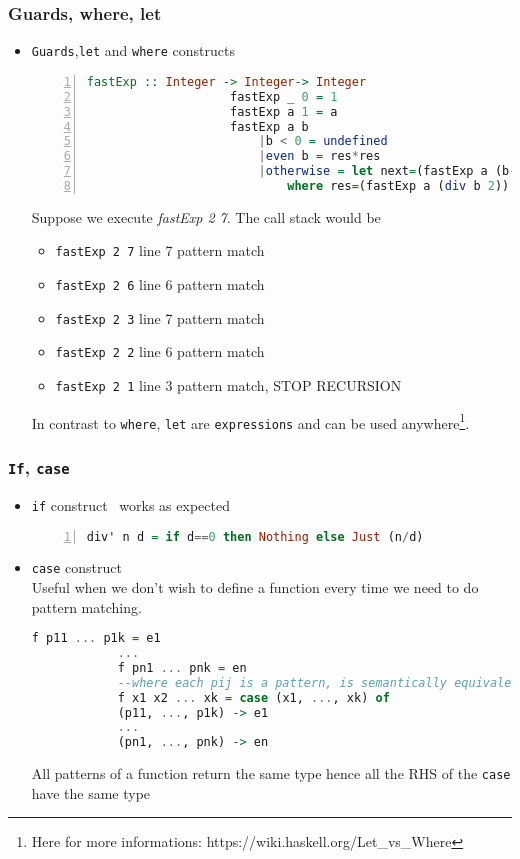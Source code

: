 	\begin{frame}[fragile]\frametitle{Guards, where, let}
		\begin{itemize}
			\item \texttt{Guards},\texttt{let} and \texttt{where} constructs
			\begin{lstlisting}[language=Haskell,basicstyle=\footnotesize\ttfamily,numbers=left]
			fastExp :: Integer -> Integer-> Integer
					fastExp _ 0 = 1
					fastExp a 1 = a
					fastExp a b 
					 	|b < 0 = undefined
					 	|even b = res*res
					 	|otherwise = let next=(fastExp a (b-1)) in (a * next)  
						  	where res=(fastExp a (div b 2))
			\end{lstlisting}
			Suppose we execute \emph{fastExp 2 7}. The call stack would be
			\begin{itemize}
			  \item  \texttt{fastExp 2 7} line 7 pattern match
			  \pause
			  \item  \texttt{fastExp 2 6} line 6 pattern match
			  \pause
			  \item  \texttt{fastExp 2 3} line 7 pattern match
			 \pause
			  \item  \texttt{fastExp 2 2} line 6 pattern match
			 \pause
			  \item  \texttt{fastExp 2 1} line 3 pattern match, STOP RECURSION
			 \end{itemize}
			 \pause
			 In contrast to \texttt{where}, \texttt{let} are \texttt{expressions} and can
			 be used anywhere\footnote{Here for more informations:
			 https://wiki.haskell.org/Let\_vs\_Where}.

	
		\end{itemize}
	\end{frame}
	
	
	
		\begin{frame}[fragile]\frametitle{\texttt{If}, \texttt{case}}
		\begin{itemize}
			\item \texttt{if} construct \
			works as expected
			\begin{lstlisting}[language=Haskell,basicstyle=\footnotesize\ttfamily,numbers=left]
			div' n d = if d==0 then Nothing else Just (n/d)
			\end{lstlisting}

			\item \texttt{case} construct \\
			 Useful when we don't wish to define a function every time we need to
			 do pattern matching.
			 
			\begin{lstlisting}[language=Haskell,basicstyle=\footnotesize\ttfamily]
			f p11 ... p1k = e1
			...
			f pn1 ... pnk = en
			--where each pij is a pattern, is semantically equivalent to:
			f x1 x2 ... xk = case (x1, ..., xk) of
			(p11, ..., p1k) -> e1
			...
			(pn1, ..., pnk) -> en
			\end{lstlisting}
			All patterns of a function return the same type hence all the RHS of the
			\texttt{case} have the same type
	
		\end{itemize}
	\end{frame}
	
